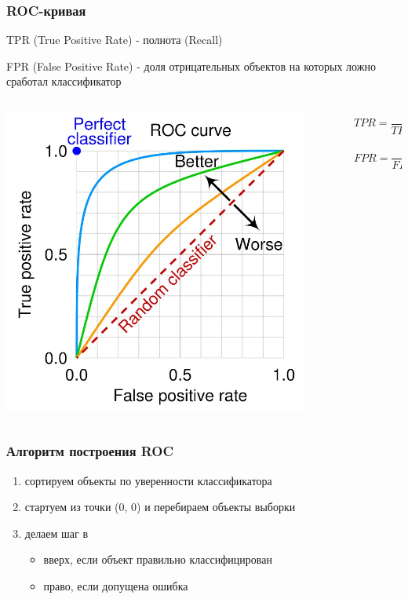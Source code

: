 \documentclass{beamer}
\begin{document}
	\begin{frame}
		\frametitle{ROC-кривая}
		 TPR (True Positive Rate) - полнота (Recall)
		 
		 FPR (False Positive Rate) - доля отрицательных объектов на которых ложно сработал классификатор
		 
		 \begin{columns}
		 	\begin{column}{0.5\textwidth}
		 		\includegraphics[width=0.9\textwidth]{img/roc.png}		
		 	\end{column}
		 	\begin{column}{0.5\textwidth}
		 		\[
		 		TPR = \frac{TP}{TP + NP}
		 		\]
		 		
		 		\[
		 		FPR = \frac{FP}{FP + TN}
		 		\]
		 	\end{column}
		 \end{columns}
	\end{frame}
	
	\begin{frame}
		\frametitle{Алгоритм построения ROC}
		
		\begin{enumerate}
			\item сортируем объекты по уверенности классификатора
			\item стартуем из точки (0, 0) и перебираем объекты выборки
			\item делаем шаг в 
			\begin{itemize}
				\item вверх, если объект правильно классифицирован
				\item право, если допущена ошибка
			\end{itemize}
		\end{enumerate}
	\end{frame}
	
\end{document}
